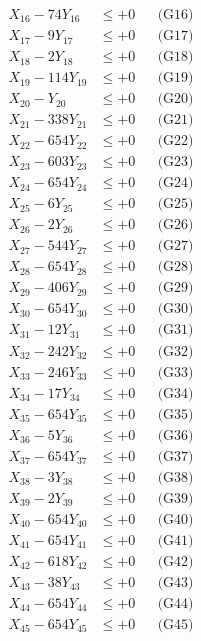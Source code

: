 \documentclass[a4paper,10pt]{article}
\begin{document}
{\begin{align}
X_{16} - 74Y_{16} &\leq +0 && \text{(G16)} \\
X_{17} - 9Y_{17} &\leq +0 && \text{(G17)} \\
X_{18} - 2Y_{18} &\leq +0 && \text{(G18)} \\
X_{19} - 114Y_{19} &\leq +0 && \text{(G19)} \\
X_{20} - Y_{20} &\leq +0 && \text{(G20)} \\
\allowbreak
X_{21} - 338Y_{21} &\leq +0 && \text{(G21)} \\
X_{22} - 654Y_{22} &\leq +0 && \text{(G22)} \\
X_{23} - 603Y_{23} &\leq +0 && \text{(G23)} \\
X_{24} - 654Y_{24} &\leq +0 && \text{(G24)} \\
X_{25} - 6Y_{25} &\leq +0 && \text{(G25)} \\
X_{26} - 2Y_{26} &\leq +0 && \text{(G26)} \\
X_{27} - 544Y_{27} &\leq +0 && \text{(G27)} \\
X_{28} - 654Y_{28} &\leq +0 && \text{(G28)} \\
X_{29} - 406Y_{29} &\leq +0 && \text{(G29)} \\
X_{30} - 654Y_{30} &\leq +0 && \text{(G30)} \\
\allowbreak
X_{31} - 12Y_{31} &\leq +0 && \text{(G31)} \\
X_{32} - 242Y_{32} &\leq +0 && \text{(G32)} \\
X_{33} - 246Y_{33} &\leq +0 && \text{(G33)} \\
X_{34} - 17Y_{34} &\leq +0 && \text{(G34)} \\
X_{35} - 654Y_{35} &\leq +0 && \text{(G35)} \\
X_{36} - 5Y_{36} &\leq +0 && \text{(G36)} \\
X_{37} - 654Y_{37} &\leq +0 && \text{(G37)} \\
X_{38} - 3Y_{38} &\leq +0 && \text{(G38)} \\
X_{39} - 2Y_{39} &\leq +0 && \text{(G39)} \\
X_{40} - 654Y_{40} &\leq +0 && \text{(G40)} \\
\allowbreak
X_{41} - 654Y_{41} &\leq +0 && \text{(G41)} \\
X_{42} - 618Y_{42} &\leq +0 && \text{(G42)} \\
X_{43} - 38Y_{43} &\leq +0 && \text{(G43)} \\
X_{44} - 654Y_{44} &\leq +0 && \text{(G44)} \\
X_{45} - 654Y_{45} &\leq +0 && \text{(G45)} \\

\end{align}}
\end{document}
